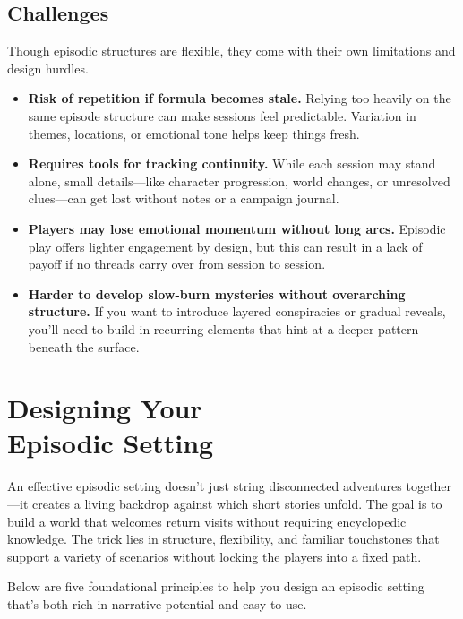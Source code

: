 \subsection*{Challenges}

Though episodic structures are flexible, they come with their own limitations and design hurdles.

\begin{itemize}\raggedright
    \item \textbf{Risk of repetition if formula becomes stale.} Relying too heavily on the same episode structure can make sessions feel predictable. Variation in themes, locations, or emotional tone helps keep things fresh.

    \item \textbf{Requires tools for tracking continuity.} While each session may stand alone, small details—like character progression, world changes, or unresolved clues—can get lost without notes or a campaign journal.

    \item \textbf{Players may lose emotional momentum without long arcs.} Episodic play offers lighter engagement by design, but this can result in a lack of payoff if no threads carry over from session to session.

    \item \textbf{Harder to develop slow-burn mysteries without overarching structure.} If you want to introduce layered conspiracies or gradual reveals, you’ll need to build in recurring elements that hint at a deeper pattern beneath the surface.
\end{itemize}


\section[Designing Your Episodic Setting]{Designing Your\\ Episodic Setting}

An effective episodic setting doesn’t just string disconnected adventures together—it creates a living backdrop against which short stories unfold. The goal is to build a world that welcomes return visits without requiring encyclopedic knowledge. The trick lies in structure, flexibility, and familiar touchstones that support a variety of scenarios without locking the players into a fixed path.

Below are five foundational principles to help you design an episodic setting that’s both rich in narrative potential and easy to use.

